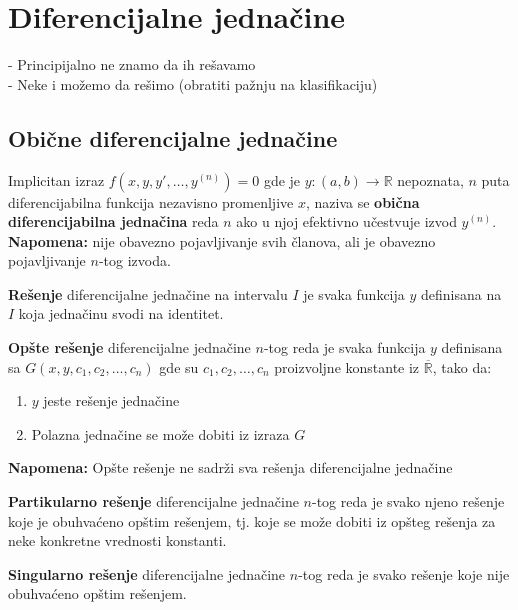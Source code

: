 \section{Diferencijalne jednačine}
- Principijalno ne znamo da ih rešavamo\\
- Neke i možemo da rešimo (obratiti pažnju na klasifikaciju)
\subsection{Obične diferencijalne jednačine}
\begin{definition}
	Implicitan izraz $f(x,y,y',\ldots,y^{(n)})=0$ gde je $y:(a,b)\to \mathbb{R}$ nepoznata, $n$ puta diferencijabilna funkcija nezavisno promenljive $x$, naziva se \textbf{obična diferencijabilna jednačina} reda $n$ ako u njoj efektivno učestvuje izvod $y^{(n)}$.\\
	\textbf{Napomena:} nije obavezno pojavljivanje svih članova, ali je obavezno pojavljivanje $n$-tog izvoda.
\end{definition}
\begin{definition}
	\textbf{Rešenje} diferencijalne jednačine na intervalu $I$ je svaka funkcija $y$ definisana na $I$ koja jednačinu svodi na identitet.\\
\end{definition}
\begin{definition}
	\textbf{Opšte rešenje} diferencijalne jednačine $n$-tog reda je svaka funkcija $y$ definisana sa $G(x,y,c_1,c_2,\ldots,c_n)$ gde su $c_1,c_2,\ldots,c_n$ proizvoljne konstante iz $\overline{\mathbb{R}}$, tako da:
	\begin{enumerate}[label=\arabic*)]
		\item
			$y$ jeste rešenje jednačine
		\item
			Polazna jednačine se može dobiti iz izraza $G$
	\end{enumerate}
	\textbf{Napomena:} Opšte rešenje ne sadrži sva rešenja diferencijalne jednačine
\end{definition}
\begin{definition}
	\textbf{Partikularno rešenje} diferencijalne jednačine $n$-tog reda je svako njeno rešenje koje je obuhvaćeno opštim rešenjem, tj. koje se može dobiti iz opšteg rešenja za neke konkretne vrednosti konstanti.
\end{definition}
\begin{definition}
	\textbf{Singularno rešenje} diferencijalne jednačine $n$-tog reda je svako rešenje koje nije obuhvaćeno opštim rešenjem.
\end{definition}
